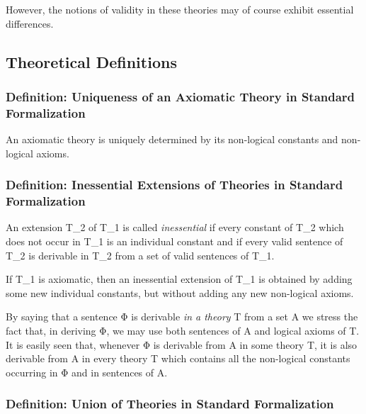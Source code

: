 However, the notions of validity in these theories may of course exhibit
essential differences.

\hypertarget{theoretical-definitions}{%
\subsection{Theoretical Definitions}\label{theoretical-definitions}}

\hypertarget{definition-uniqueness-of-an-axiomatic-theory-in-standard-formalization}{%
\subsubsection{Definition: Uniqueness of an Axiomatic Theory in Standard
Formalization}\label{definition-uniqueness-of-an-axiomatic-theory-in-standard-formalization}}

An axiomatic theory is uniquely determined by its non-logical constants
and non-logical axioms.

\hypertarget{definition-inessential-extensions-of-theories-in-standard-formalization}{%
\subsubsection{Definition: Inessential Extensions of Theories in
Standard
Formalization}\label{definition-inessential-extensions-of-theories-in-standard-formalization}}

An extension T\_2 of T\_1 is called \emph{inessential} if every constant
of T\_2 which does not occur in T\_1 is an individual constant and if
every valid sentence of T\_2 is derivable in T\_2 from a set of valid
sentences of T\_1.

If T\_1 is axiomatic, then an inessential extension of T\_1 is obtained
by adding some new individual constants, but without adding any new
non-logical axioms.

By saying that a sentence Φ is derivable \emph{in a theory} T from a set
A we stress the fact that, in deriving Φ, we may use both sentences of A
and logical axioms of T. It is easily seen that, whenever Φ is derivable
from A in some theory T, it is also derivable from A in every theory
T\textquotesingle{} which contains all the non-logical constants
occurring in Φ and in sentences of A.

\hypertarget{definition-union-of-theories-in-standard-formalization}{%
\subsubsection{Definition: Union of Theories in Standard
Formalization}\label{definition-union-of-theories-in-standard-formalization}}

